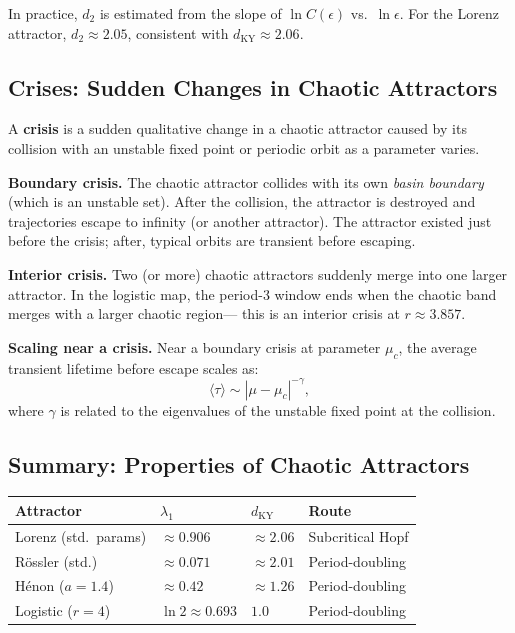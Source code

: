 \documentclass[11pt,letterpaper]{article}
\theoremstyle{definition}
\theoremstyle{plain}
\theoremstyle{remark}
\begin{document}
In practice, $d_2$ is estimated from the slope of $\ln C(\epsilon)$
vs.\ $\ln\epsilon$.  For the Lorenz attractor, $d_2 \approx 2.05$,
consistent with $d_{\mathrm{KY}} \approx 2.06$.

\subsection{Crises: Sudden Changes in Chaotic Attractors}

A \textbf{crisis} is a sudden qualitative change in a chaotic attractor
caused by its collision with an unstable fixed point or periodic orbit
as a parameter varies.

\textbf{Boundary crisis.}  The chaotic attractor collides with its own
\emph{basin boundary} (which is an unstable set).  After the collision,
the attractor is destroyed and trajectories escape to infinity (or
another attractor).  The attractor existed just before the crisis;
after, typical orbits are transient before escaping.

\textbf{Interior crisis.}  Two (or more) chaotic attractors suddenly
merge into one larger attractor.  In the logistic map, the period-3
window ends when the chaotic band merges with a larger chaotic region---
this is an interior crisis at $r \approx 3.857$.

\textbf{Scaling near a crisis.}  Near a boundary crisis at parameter
$\mu_c$, the average transient lifetime before escape scales as:
\begin{equation}
  \langle\tau\rangle \sim |\mu - \mu_c|^{-\gamma},
\end{equation}
where $\gamma$ is related to the eigenvalues of the unstable fixed point
at the collision.

\subsection{Summary: Properties of Chaotic Attractors}

\begin{center}
\renewcommand{\arraystretch}{1.4}
\begin{tabular}{@{}llll@{}}
\toprule
\textbf{Attractor} & $\lambda_1$ & $d_{\mathrm{KY}}$ & \textbf{Route} \\
\midrule
Lorenz (std.\ params) & $\approx 0.906$ & $\approx 2.06$ & Subcritical Hopf \\
R\"ossler (std.) & $\approx 0.071$ & $\approx 2.01$ & Period-doubling \\
H\'enon ($a=1.4$) & $\approx 0.42$ & $\approx 1.26$ & Period-doubling \\
Logistic ($r=4$) & $\ln 2 \approx 0.693$ & $1.0$ & Period-doubling \\
\bottomrule
\end{tabular}
\end{center}
\end{document}
